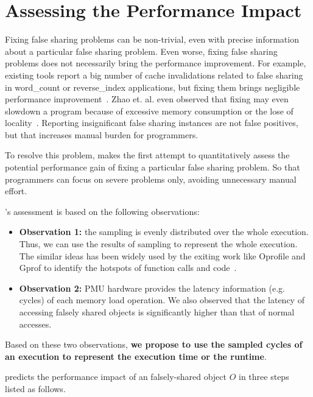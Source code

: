 \section{Assessing the Performance Impact}

\label{sec:predictimprove}

Fixing false sharing problems can be non-trivial, even with precise information about a particular false sharing problem. Even worse, fixing false sharing problems does not necessarily bring the performance improvement. For example, existing tools report a big number of cache invalidations related to false sharing in word\_count or reverse\_index applications, but fixing them brings negligible performance improvement~\cite{Sheriff, Predator}. Zhao et. al. even observed that fixing may even slowdown a program because of excessive memory consumption or the lose of locality~\cite{qinzhao}. Reporting insignificant false sharing instances are not false positives, but that increases manual burden for programmers.

To resolve this problem, \cheetah{} makes the first attempt to quantitatively assess the potential performance gain of fixing a particular false sharing problem. So that programmers can focus on severe problems only, avoiding unnecessary manual effort.

\cheetah{}'s assessment is based on the following observations:

\begin{itemize}
\item {\bf Observation 1:} the sampling is evenly distributed over the whole execution. Thus, we can  use the results of sampling to represent the whole execution. The similar ideas has been widely used by the exiting work like Oprofile and Gprof to identify the hotspots of function calls and code~\cite{oprofile, DBLP:conf/sigplan/GrahamKM82}.

\item {\bf Observation 2:} PMU hardware provides the latency information (e.g. cycles) of each memory load operation. We also observed that the latency of accessing falsely shared objects is significantly higher than that of normal accesses. 

\end{itemize}

Based on these two observations, {\bf we propose to use the sampled cycles of an execution to represent the execution time or the runtime}. 

\cheetah{} predicts the performance impact of an falsely-shared object $O$ in three steps listed as follows. 


